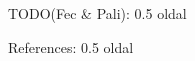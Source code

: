 \documentclass[article]{IEEEtran}
\begin{document}
TODO(Fec \& Pali): 0.5 oldal


References: 0.5 oldal


%
%

%

%
%
\end{document}
